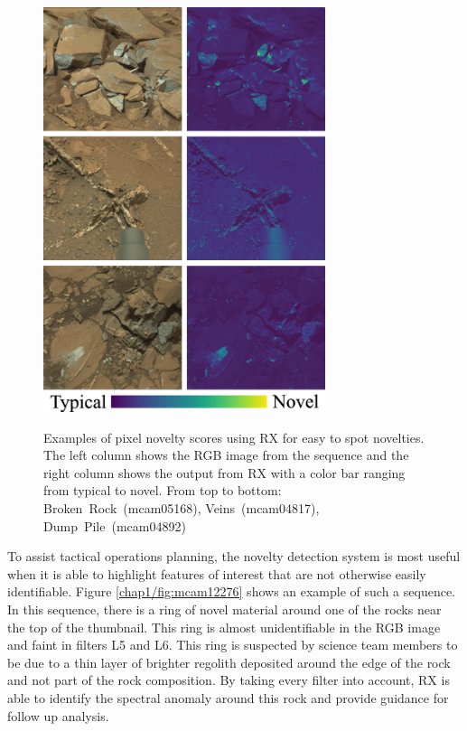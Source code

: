 \begin{figure}
\centering
\includegraphics[width=3.25in]{figs/1/easy.png}\\
\caption{Examples of pixel novelty scores using RX for easy to spot novelties. The left column shows the RGB image from the sequence and the right column shows the output from RX with a color bar ranging from typical to novel. From top to bottom: \mbox{Broken Rock (mcam05168)}, \mbox{Veins (mcam04817)}, \mbox{Dump Pile (mcam04892)}}
\label{chap1/fig:easyNovel}
\end{figure}

To assist tactical operations planning, the novelty detection system is most useful when it is able to highlight features of interest that are not otherwise easily identifiable. 
Figure \ref{chap1/fig:mcam12276} shows an example of such a sequence.
In this sequence, there is a ring of novel material around one of the rocks near the top of the thumbnail. 
This ring is almost unidentifiable in the RGB image and faint in filters L5 and L6. 
This ring is suspected by science team members to be due to a thin layer of brighter regolith deposited around the edge of the rock and not part of the rock composition.
By taking every filter into account, RX is able to identify the spectral anomaly around this rock and provide guidance for follow up analysis.

